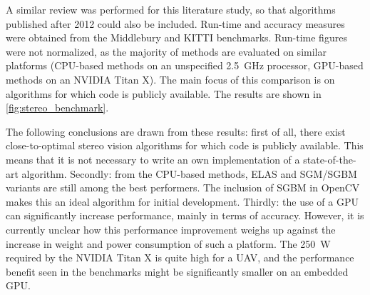A similar review was performed for this literature study, so that algorithms published after 2012 could also be included.
Run-time and accuracy measures were obtained from the Middlebury and KITTI benchmarks.
Run-time figures were not normalized, as the majority of methods are evaluated on similar platforms (CPU-based methods on an unspecified \SI{2.5}{\giga\Hz} processor, GPU-based methods on an NVIDIA Titan X).
The main focus of this comparison is on algorithms for which code is publicly available.
The results are shown in \autoref{fig:stereo_benchmark}.

The following conclusions are drawn from these results: first of all, there exist close-to-optimal stereo vision algorithms for which code is publicly available.
This means that it is not necessary to write an own implementation of a state-of-the-art algorithm.
Secondly: from the CPU-based methods, \acs{ELAS} \cite{Geiger2011} and \acs{SGM}/\acs{SGBM} variants \cite{Hirschmuller2008} are still among the best performers.
The inclusion of \acs{SGBM} in OpenCV makes this an ideal algorithm for initial development.
Thirdly: the use of a GPU can significantly increase performance, mainly in terms of accuracy.
However, it is currently unclear how this performance improvement weighs up against the increase in weight and power consumption of such a platform.
The \SI{250}{\W} required by the NVIDIA Titan X is quite high for a \ac{UAV}, and the performance benefit seen in the benchmarks might be significantly smaller on an embedded GPU.

